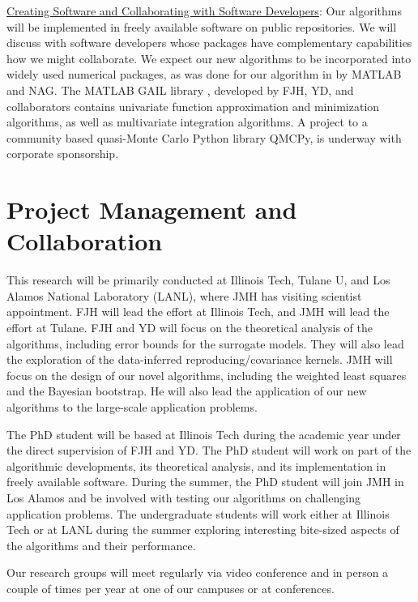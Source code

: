 \documentclass[11pt]{NSFamsart}
\newcommand{\Upara}[1]{\noindent\underline{\upshape #1}:}
\newcommand{\GAIL}{GAIL\xspace}
\newcommand{\NAG}{NAG\xspace}
\newcommand{\MATLAB}{MATLAB\xspace}
\begin{document}
\Upara{Creating Software and Collaborating with Software Developers}
Our algorithms will be implemented in freely available software on public repositories.  We will discuss with software developers whose packages have complementary capabilities how we might collaborate. We expect our new algorithms to be incorporated into widely used numerical packages, as was done for our algorithm in \cite{HonHic00a} by \MATLAB and \NAG.  The \MATLAB \GAIL library \citep{ChoEtal19a}, developed by FJH, YD, and collaborators contains univariate function approximation and minimization algorithms, as well as multivariate integration algorithms.  A project to a community based quasi-Monte Carlo Python library QMCPy, is underway with corporate sponsorship.  

\section{Project Management and Collaboration}
This research will be primarily conducted at Illinois Tech, Tulane U, and Los Alamos National Laboratory (LANL), where JMH has visiting scientist appointment.  FJH will lead the effort at Illinois Tech, and JMH will lead the effort at Tulane.  FJH and YD will focus on the theoretical analysis of the algorithms, including error bounds for the surrogate models.  They will also lead the exploration of the data-inferred reproducing/covariance kernels.  JMH will focus on the design of our novel algorithms, including the weighted least squares and the Bayesian bootstrap.  He will also lead the application of our new algorithms to the large-scale application problems.  

The PhD student will be based at Illinois Tech during the academic year under the direct supervision of FJH and YD.  The PhD student will work on part of the algorithmic developments, its theoretical analysis, and its implementation in freely available software.  During the summer, the PhD student will join JMH in Los Alamos and be involved with testing our algorithms on challenging application problems.  The undergraduate students will work either at Illinois Tech or at LANL during the summer exploring interesting bite-sized aspects of the algorithms and their performance.

Our research groups will meet regularly via video conference and in person a couple of times per year at one of our campuses or at conferences.
\end{document}
